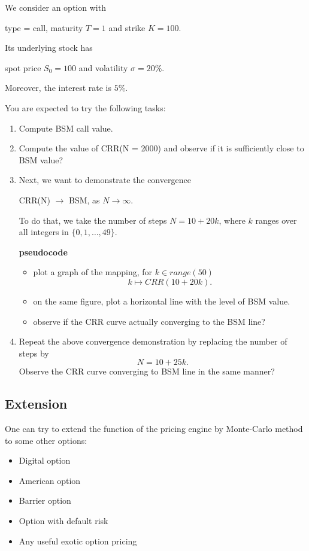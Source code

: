 \documentclass{article}
\begin{document}
We consider an option with 
\begin{center}
 type = call, maturity $T = 1$ and strike $K = 100$.
\end{center}
Its underlying stock has 
\begin{center}
 spot price $S_{0} = 100$ and volatility $\sigma = 20\%$.
\end{center}
Moreover, the interest rate is $5\%$.

You are expected to try the following tasks:
\begin{enumerate}
 \item Compute BSM call value.
 \item Compute the value of CRR(N = 2000) and observe if it is sufficiently close to BSM value?
 \item Next, we want to demonstrate the convergence 
\begin{center}
 CRR(N) $\to$ BSM, as $N\to \infty$.
\end{center} 
To do that, we take the number of steps 
$N = 10 + 20k$, where $k$ ranges over all integers in $\{0, 1, \ldots, 49\}$.

{\bf pseudocode} 
\begin{itemize}
\item plot a graph of the mapping, for $k \in range(50)$
$$k \mapsto CRR(10 + 20k).$$ 
\item on the same figure, plot a horizontal line with the level of BSM value.
\item observe if the CRR curve actually converging to the BSM line?
\end{itemize}

\item Repeat the above convergence demonstration by replacing the number of steps by
$$N = 10 + 25 k.$$
Observe the CRR curve converging to BSM line in the same manner?

\end{enumerate}


\subsection{Extension}
One can try to extend the function of the pricing engine by Monte-Carlo method to some other options:
\begin{itemize}
\item Digital option
\item American option
\item Barrier option
\item Option with default risk
\item Any useful exotic option pricing
\end{itemize}
\end{document}
